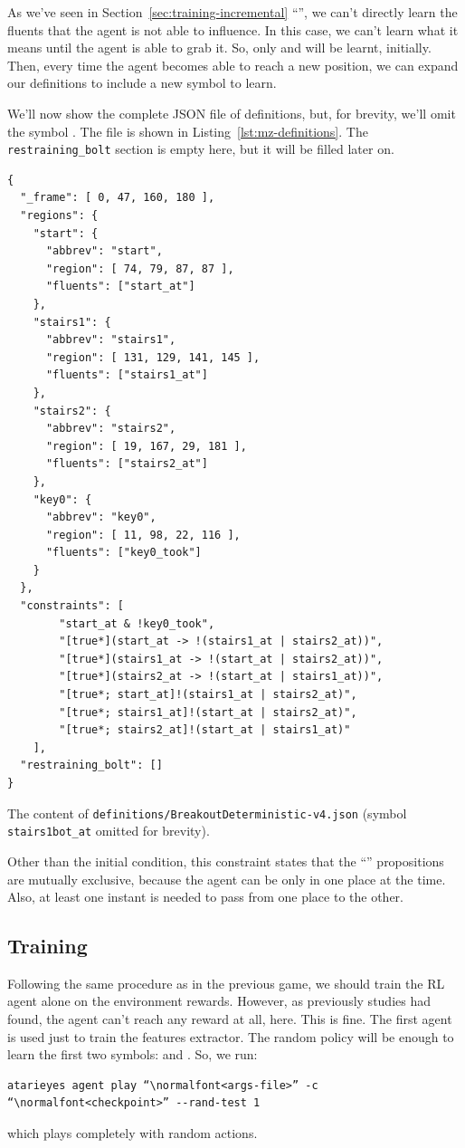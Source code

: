 As we've seen in Section~\ref{sec:training-incremental}
``'', we can't directly learn the fluents
that the agent is not able to influence. In this case, we can't learn what it
means  until the agent is able to grab it. So, only
 and  will be learnt, initially. Then, every
time the agent becomes able to reach a new position, we can expand our
definitions to include a new symbol to learn.

We'll now show the complete JSON file of definitions, but, for brevity, we'll
omit the symbol . The file is shown in
Listing~\ref{lst:mz-definitions}. The \texttt{restraining\_bolt} section is
empty here, but it will be filled later on.
\begin{listing}
\begin{verbatim}
{
  "_frame": [ 0, 47, 160, 180 ],
  "regions": {
    "start": {
      "abbrev": "start",
      "region": [ 74, 79, 87, 87 ],
      "fluents": ["start_at"]
    },
    "stairs1": {
      "abbrev": "stairs1",
      "region": [ 131, 129, 141, 145 ],
      "fluents": ["stairs1_at"]
    },
    "stairs2": {
      "abbrev": "stairs2",
      "region": [ 19, 167, 29, 181 ],
      "fluents": ["stairs2_at"]
    },
    "key0": {
      "abbrev": "key0",
      "region": [ 11, 98, 22, 116 ],
      "fluents": ["key0_took"]
    }
  },
  "constraints": [
		"start_at & !key0_took",
		"[true*](start_at -> !(stairs1_at | stairs2_at))",
		"[true*](stairs1_at -> !(start_at | stairs2_at))",
		"[true*](stairs2_at -> !(start_at | stairs1_at))",
		"[true*; start_at]!(stairs1_at | stairs2_at)",
		"[true*; stairs1_at]!(start_at | stairs2_at)",
		"[true*; stairs2_at]!(start_at | stairs1_at)"
	],
  "restraining_bolt": []
}
\end{verbatim}
\caption{The content of \texttt{definitions/BreakoutDeterministic-v4.json}
(symbol \texttt{stairs1bot\_at} omitted for brevity).}
\label{lst:mz-definitions}
\end{listing}
Other than the initial condition, this constraint states that the
``'' propositions are mutually exclusive, because the agent can be
only in one place at the time. Also, at least one instant is needed to pass
from one place to the other.


\subsection{Training}

Following the same procedure as in the previous game, we should train the RL
agent alone on the environment rewards. However, as previously studies had
found, the agent can't reach any reward at all, here. This is fine. The first
agent is used just to train the features extractor. The random policy will be
enough to learn the first two symbols:  and .
So, we run:
\begin{verbatim}
atarieyes agent play “\normalfont<args-file>” -c “\normalfont<checkpoint>” --rand-test 1
\end{verbatim}
which plays completely with random actions.

